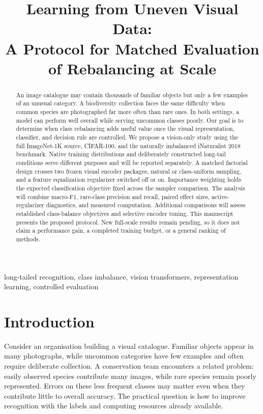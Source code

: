 \documentclass[conference]{IEEEtran}
\title{Learning from Uneven Visual Data:\\A Protocol for Matched Evaluation of Rebalancing at Scale}
\author{\IEEEauthorblockN{Savannah Shannon, Kishor Datta Gupta, and Roy George}}
\date{}
\begin{document}
\maketitle

\begin{abstract}
An image catalogue may contain thousands of familiar objects but only a few examples of an unusual category. A biodiversity collection faces the same difficulty when common species are photographed far more often than rare ones. In both settings, a model can perform well overall while serving uncommon classes poorly. Our goal is to determine when class rebalancing adds useful value once the visual representation, classifier, and decision rule are controlled. We propose a vision-only study using the full ImageNet-1K source, CIFAR-100, and the naturally imbalanced iNaturalist 2018 benchmark. Native training distributions and deliberately constructed long-tail conditions serve different purposes and will be reported separately. A matched factorial design crosses two frozen visual encoder packages, natural or class-uniform sampling, and a feature equalization regularizer switched off or on. Importance weighting holds the expected classification objective fixed across the sampler comparison. The analysis will combine macro-F1, rare-class precision and recall, paired effect sizes, active-regularizer diagnostics, and measured computation. Additional comparisons will assess established class-balance objectives and selective encoder tuning. This manuscript presents the proposed protocol. New full-scale results remain pending, so it does not claim a performance gain, a completed training budget, or a general ranking of methods.
\end{abstract}

\begin{IEEEkeywords}
long-tailed recognition, class imbalance, vision transformers, representation learning, controlled evaluation
\end{IEEEkeywords}

\section{Introduction}
Consider an organisation building a visual catalogue. Familiar objects appear in many photographs, while uncommon categories have few examples and often require deliberate collection. A conservation team encounters a related problem: easily observed species contribute many images, while rare species remain poorly represented. Errors on these less frequent classes may matter even when they contribute little to overall accuracy. The practical question is how to improve recognition with the labels and computing resources already available.
\end{document}
